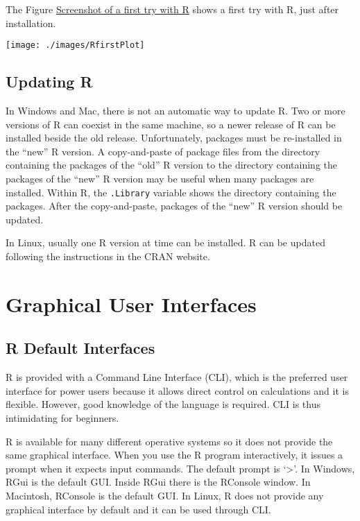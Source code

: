 \documentclass[]{book}
\begin{document}
The Figure \protect\hyperlink{fig:ssFirsttry}{Screenshot of a first try
with R} shows a first try with R, just after installation.

\hypertarget{fig:ssFirsttry}{}
\texttt{[image: ./images/RfirstPlot]}

\subsection{Updating R}\label{updating-r}

In Windows and Mac, there is not an automatic way to update R. Two or
more versions of R can coexist in the same machine, so a newer release
of R can be installed beside the old release. Unfortunately, packages
must be re-installed in the ``new'' R version. A copy-and-paste of
package files from the directory containing the packages of the ``old''
R version to the directory containing the packages of the ``new'' R
version may be useful when many packages are installed. Within R, the
\texttt{.Library} variable shows the directory containing the packages.
After the copy-and-paste, packages of the ``new'' R version should be
updated.

In Linux, usually one R version at time can be installed. R can be
updated following the instructions in the CRAN website.

\section{Graphical User Interfaces}\label{graphical-user-interfaces}

\subsection{R Default Interfaces}\label{r-default-interfaces}

R is provided with a Command Line Interface (CLI), which is the
preferred user interface for power users because it allows direct
control on calculations and it is flexible. However, good knowledge of
the language is required. CLI is thus intimidating for beginners.

R is available for many different operative systems so it does not
provide the same graphical interface. When you use the R program
interactively, it issues a prompt when it expects input commands. The
default prompt is `\textgreater{}'. In Windows, RGui is the default GUI.
Inside RGui there is the RConsole window. In Macintosh, RConsole is the
default GUI. In Linux, R does not provide any graphical interface by
default and it can be used through CLI.
\end{document}
